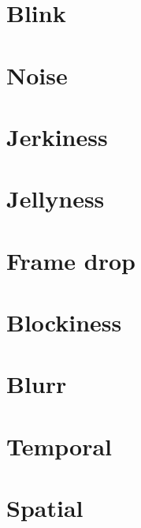 

\section{Blink}
\section{Noise}
\section{Jerkiness}
\section{Jellyness}
\section{Frame drop}
\section{Blockiness}
\section{Blurr}
\section{Temporal}
\section{Spatial}

